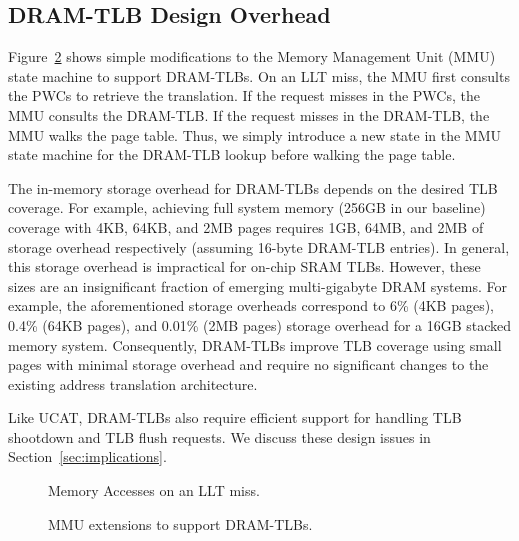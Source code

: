 \subsection{DRAM-TLB Design Overhead}

\noindent Figure~\ref{fig:mmu_state} shows simple modifications to the
Memory Management Unit (MMU) state machine to support DRAM-TLBs. On an
LLT miss, the MMU first consults the PWCs to retrieve the translation.
If the request misses in the PWCs, the MMU consults the DRAM-TLB. If
the request misses in the DRAM-TLB, the MMU walks the page table.
Thus, we simply introduce a new state in the MMU state machine for the
DRAM-TLB lookup before walking the page table.

The in-memory storage overhead for DRAM-TLBs depends on the desired
TLB coverage. For example, achieving full system memory (256GB in our
baseline) coverage with 4KB, 64KB, and 2MB pages requires 1GB, 64MB,
and 2MB of storage overhead respectively (assuming 16-byte DRAM-TLB
entries). In general, this storage overhead is impractical for on-chip
SRAM TLBs. However, these sizes are an insignificant fraction of
emerging multi-gigabyte DRAM systems. For example, the aforementioned
storage overheads correspond to 6\% (4KB pages), 0.4\% (64KB pages),
and 0.01\% (2MB pages) storage overhead for a 16GB stacked memory
system. Consequently, DRAM-TLBs improve TLB coverage using small pages
with minimal storage overhead and require no significant changes to
the existing address translation architecture. 

Like UCAT, DRAM-TLBs also require efficient support for handling TLB
shootdown and TLB flush requests. We discuss these design issues in
Section~\ref{sec:implications}.

\begin{figure}[tp] 
  \vspace{0.2in} \centering
  \centerline{}

  \caption{\small Memory Accesses on an LLT miss.\normalsize}
 \label{fig:memaccess_DRAMTLB} 
  \vspace{0.0 in}
\end{figure}


\begin{figure}[b] 
  \vspace{-0. in} \centering
  \centerline{}

  \caption{\small MMU extensions to support DRAM-TLBs.
    \normalsize}
  \label{fig:mmu_state} 
  \vspace{-0 in}
\end{figure}



